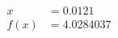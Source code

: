 \documentclass[preview]{standalone}
\begin{document}
\begin{align*}
x &= 0.0121\\f(x) &= 4.0284037
\end{align*}
\end{document}
